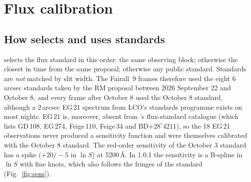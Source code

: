 \section{Flux calibration}
\label{sec:flux}

\subsection{How \banzai{} selects and uses standards}
\label{sec:flux_banzai}
\banzai{} selects the flux standard in this order: the same observing block; otherwise the closest in time from the
same proposal; otherwise any public standard. Standards are \emph{not} matched by slit width. The Fairall~9 frames
therefore used the eight 6\,arcsec standards taken by the RM proposal between 2026 September 22 and October 8, and
every frame after October 8 used the October 8 standard, although a 2\,arcsec EG\,21 spectrum from LCO's standards
programme exists on most nights. EG\,21 is, moreover, absent from \banzai's flux-standard catalogue (which lists
GD\,108, EG\,274, Feige\,110, Feige\,34 and BD$+28^\circ4211$), so the 18 EG\,21 observations never produced a
sensitivity function and were themselves calibrated with the October 8 standard. The red-order sensitivity of the
October 3 standard has a spike ($+20/-5$ in $\ln S$) at 5200\,\AA. In 1.0.1 the sensitivity is a B-spline in $\ln S$
with fine knots, which also follows the fringes of the standard (Fig.~\ref{fig:sens}).

